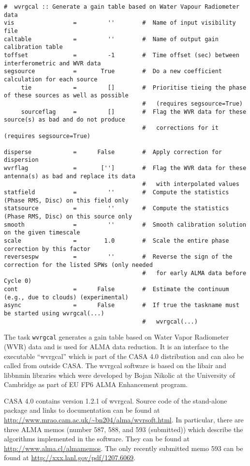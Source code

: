 \small
\begin{verbatim}
#  wvrgcal :: Generate a gain table based on Water Vapour Radiometer data
vis                 =         ''        #  Name of input visibility file
caltable            =         ''        #  Name of output gain calibration table
toffset             =         -1        #  Time offset (sec) between interferometric and WVR data
segsource           =       True        #  Do a new coefficient calculation for each source
     tie            =         []        #  Prioritise tieing the phase of these sources as well as possible
                                        #   (requires segsource=True)
     sourceflag     =         []        #  Flag the WVR data for these source(s) as bad and do not produce
                                        #   corrections for it (requires segsource=True)

disperse            =      False        #  Apply correction for dispersion
wvrflag             =       ['']        #  Flag the WVR data for these antenna(s) as bad and replace its data
                                        #   with interpolated values
statfield           =         ''        #  Compute the statistics (Phase RMS, Disc) on this field only
statsource          =         ''        #  Compute the statistics (Phase RMS, Disc) on this source only
smooth              =         ''        #  Smooth calibration solution on the given timescale
scale               =        1.0        #  Scale the entire phase correction by this factor
reversespw          =         ''        #  Reverse the sign of the correction for the listed SPWs (only needed
                                        #   for early ALMA data before Cycle 0)
cont                =      False        #  Estimate the continuum (e.g., due to clouds) (experimental)
async               =      False        #  If true the taskname must be started using wvrgcal(...)
                                        #   wvrgcal(...)
\end{verbatim}
\normalsize

The task {\tt wvrgcal} generates a gain table based on Water Vapor
Radiometer (WVR) data and is used for ALMA data reduction. It is an
interface to the executable ``wvrgcal'' which is part of the CASA 4.0
distribution and can also be called from outside CASA. The wvrgcal
software is based on the libair and libbnmin libraries which were
developed by Bojan Nikolic at the University of Cambridge as part of
EU FP6 ALMA Enhancement program.

CASA 4.0 contains version 1.2.1 of wvrgcal. Source code of the
stand-alone package and links to documentation can be found at
\url{http://www.mrao.cam.ac.uk/\~bn204/alma/wvrsoft.html}. In
particular, there are three ALMA memos (number 587, 588, and 593
(submitted)) which describe the algorithms implemented in the
software. They can be found at \url{http://www.alma.cl/almamemos}.
The only recently submitted memo 593 can be found at
\url{http://xxx.lanl.gov/pdf/1207.6069}.

